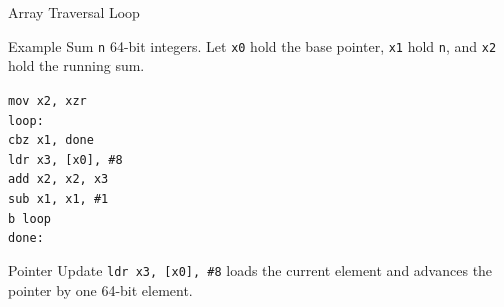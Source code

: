\documentclass[aspectratio=169,11pt,t]{beamer}
\newcommand{\code}[1]{\texttt{#1}}
\begin{document}
\begin{frame}{Array Traversal Loop}
\begin{block}{Example}
Sum \code{n} 64-bit integers. Let \code{x0} hold the base pointer, \code{x1} hold \code{n}, and \code{x2} hold the running sum.
\end{block}
\vspace{0.05cm}
\small
\hspace{3.3cm}\code{mov x2, xzr}\\[0.05cm]
\hspace{2.8cm}\code{loop:}\\[0.05cm]
\hspace{3.3cm}\code{cbz x1, done}\\[0.05cm]
\hspace{3.3cm}\code{ldr x3, [x0], \#8}\\[0.05cm]
\hspace{3.3cm}\code{add x2, x2, x3}\\[0.05cm]
\hspace{3.3cm}\code{sub x1, x1, \#1}\\[0.05cm]
\hspace{3.3cm}\code{b loop}\\[0.05cm]
\hspace{2.8cm}\code{done:}
\vspace{0.05cm}
\begin{block}{Pointer Update}
\code{ldr x3, [x0], \#8} loads the current element and advances the pointer by one 64-bit element.
\end{block}
\end{frame}



\end{document}
